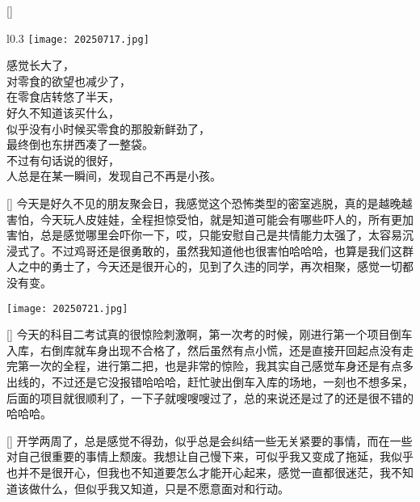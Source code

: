 \documentclass{diary}
\begin{document}
[\hot]%
\vspace{-1.5em}
\setlength{\columnsep}{2em}
\begin{wrapfigure}{l}{0.3\linewidth} 
  \vspace{-0.8em}
  \texttt{[image: 20250717.jpg]} 
\end{wrapfigure}
\noindent
感觉长大了，\\
对零食的欲望也减少了，\\
在零食店转悠了半天，\\
好久不知道该买什么，\\
似乎没有小时候买零食的那股新鲜劲了，\\
最终倒也东拼西凑了一整袋。\\
不过有句话说的很好，\\
人总是在某一瞬间，发现自己不再是小孩。


[\laughing]%
今天是好久不见的朋友聚会日，我感觉这个恐怖类型的密室逃脱，真的是越晚越害怕，今天玩人皮娃娃，全程担惊受怕，就是知道可能会有哪些吓人的，所有更加害怕，总是感觉哪里会吓你一下，哎，只能安慰自己是共情能力太强了，太容易沉浸式了。不过鸡哥还是很勇敢的，虽然我知道他也很害怕哈哈哈，也算是我们这群人之中的勇士了，今天还是很开心的，见到了久违的同学，再次相聚，感觉一切都没有变。
\begin{center}
    \texttt{[image: 20250721.jpg]}
\end{center}

[\dizzy]%
今天的科目二考试真的很惊险刺激啊，第一次考的时候，刚进行第一个项目倒车入库，右倒库就车身出现不合格了，然后虽然有点小慌，还是直接开回起点没有走完第一次的全程，进行第二把，也是非常的惊险，我其实自己感觉车身还是有点多出线的，不过还是它没报错哈哈哈，赶忙驶出倒车入库的场地，一刻也不想多呆，后面的项目就很顺利了，一下子就嗖嗖嗖过了，总的来说还是过了的还是很不错的哈哈哈。

\Address[江苏][南京]
[\confused]%
开学两周了，总是感觉不得劲，似乎总是会纠结一些无关紧要的事情，而在一些对自己很重要的事情上颓废。我想让自己慢下来，可似乎我又变成了拖延，我似乎也并不是很开心，但我也不知道要怎么才能开心起来，感觉一直都很迷茫，我不知道该做什么，但似乎我又知道，只是不愿意面对和行动。
\end{document}
